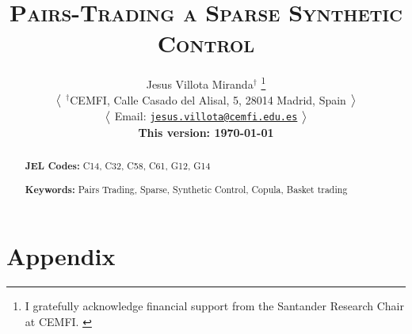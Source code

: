 \documentclass[12pt,a4paper]{article}
\title{
\textsc{
\Large 
Pairs-Trading a Sparse Synthetic Control 
}
}
\author[1]{
{  
{
\large 
Jesus Villota Miranda}$^{\dagger}$
\footnote{
\scriptsize{
I gratefully acknowledge financial support from the Santander Research Chair at CEMFI.
}
}
}

\bx 
{\small
$\big{<}$
\noindent $^{\dagger}$CEMFI, Calle Casado del Alisal, 5, 28014 Madrid, Spain 
$\big{>}$

$\big{<}$
Email: \href{mailto:jesus.villota@cemfi.edu.es}{\texttt{jesus.villota@cemfi.edu.es}}
$\big{>}$

\small \textbf{This version: \mydate\today}
}
}
\date{}
\begin{document}
\maketitle
\thispagestyle{empty}
\begin{abstract}
 

\bx 
\noindent\textbf{JEL Codes:} C14, C32, C58, C61, G12, G14

\mx 
\noindent\textbf{Keywords:} Pairs Trading, Sparse, Synthetic Control, Copula, Basket trading
\end{abstract}

\newpage
\setcounter{page}{1}
















\newpage
\processdelayedfloats 
\renewcommand{\thefigure}{A\arabic{figure}} 
\renewcommand{\thetable}{A\arabic{table}}

\appendix
\newpage
\section{Appendix}

\end{document}
